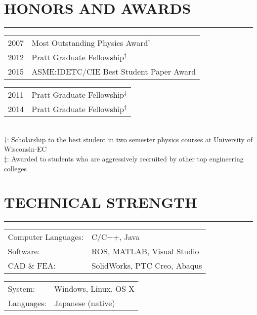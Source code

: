 \documentclass[12pt,letterpaper]{article}
\begin{document}
\section*{HONORS AND AWARDS}
\vspace{-2mm}
\hrule
\hspace{10mm}
\begin{minipage}{\columnwidth}
\begin{minipage}{0.5\columnwidth}
\begin{tabular}{l l}
2007 & Most Outstanding Physics Award$^\dagger$ \\
2012 & Pratt Graduate Fellowship$^\ddagger$\\
2015 & ASME:IDETC/CIE Best Student Paper Award\\
\end{tabular}
\end{minipage}
\begin{minipage}{0.5\columnwidth}
\begin{tabular}{l l}
2011 & Pratt Graduate Fellowship$^\ddagger$ \\
2014 & Pratt Graduate Fellowship$^\ddagger$\\ 
\end{tabular}
\end{minipage}
\\
\vspace{5mm}
$\dagger$: Scholarship to the best student in two semester physics courses at University of Wisconsin-EC\\
$\ddagger$: Awarded to students who are aggressively recruited by other top engineering colleges\\
\end{minipage}

\vspace{-5mm}
\section*{TECHNICAL STRENGTH}
\vspace{-2mm}
\hrule
\hspace{10mm}
\begin{minipage}{0.9\columnwidth}
\begin{minipage}{0.4\columnwidth}
\begin{tabular}{ll}
Computer Languages: & C/C++, Java\\
Software: & ROS, MATLAB, Visual Studio \\
CAD \& FEA: & SolidWorks, PTC Creo, Abaqus\\
\end{tabular}
\end{minipage}
\hfill
\begin{minipage}{0.4\columnwidth}
\begin{tabular}{ll}
System: & Windows, Linux, OS X\\
Languages: & Japanese (native)\\
\end{tabular}
\end{minipage}
\end{minipage}
\end{document}
